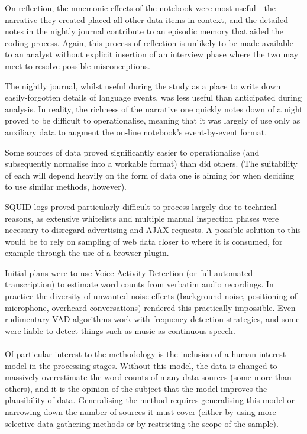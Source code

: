 On reflection, the mnemonic effects of the notebook were most useful---the narrative they created placed all other data items in context, and the detailed notes in the nightly journal contribute to an episodic memory that aided the coding process.  Again, this process of reflection is unlikely to be made available to an analyst without explicit insertion of an interview phase where the two may meet to resolve possible misconceptions.

The nightly journal, whilst useful during the study as a place to write down easily-forgotten details of language events, was less useful than anticipated during analysis.  In reality, the richness of the narrative one quickly notes down of a night proved to be difficult to operationalise, meaning that it was largely of use only as auxiliary data to augment the on-line notebook's event-by-event format.

Some sources of data proved significantly easier to operationalise (and subsequently normalise into a workable format) than did others.  (The suitability of each will depend heavily on the form of data one is aiming for when deciding to use similar methods, however).

SQUID logs proved particularly difficult to process largely due to technical reasons, as extensive whitelists and multiple manual inspection phases were necessary to disregard advertising and AJAX requests.  A possible solution to this would be to rely on sampling of web data closer to where it is consumed, for example through the use of a browser plugin.

Initial plans were to use Voice Activity Detection (or full automated transcription) to estimate word counts from verbatim audio recordings.  In practice the diversity of unwanted noise effects (background noise, positioning of microphone, overheard conversations) rendered this practically impossible.  Even rudimentary VAD algorithms work with frequency detection strategies, and some were liable to detect things such as music as continuous speech.  



\paragraph{}
Of particular interest to the methodology is the inclusion of a human interest model in the processing stages.  Without this model, the data is changed to massively overestimate the word counts of many data sources (some more than others), and it is the opinion of the subject that the model improves the plausibility of data.  Generalising the method requires generalising this model or narrowing down the number of sources it must cover (either by using more selective data gathering methods or by restricting the scope of the sample).  

